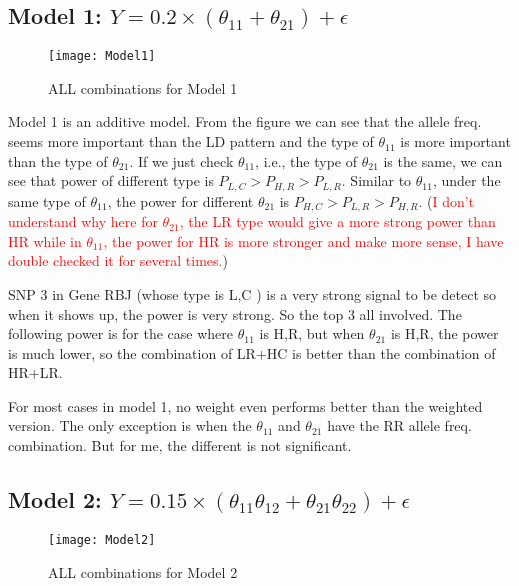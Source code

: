 \documentclass{article}
\begin{document}
    \subsection{Model 1: $Y=0.2\times(\theta_{11}+\theta_{21})+\epsilon$}    
        \begin{figure}[htbp]
            \centering
            \texttt{[image: Model1]}
            \caption{ALL combinations for Model 1}
        \end{figure}
        Model 1 is an additive model. From the figure we can see that the allele freq. seems more important than the LD pattern and the type of $\theta_{11}$ is more important than the type of $\theta_{21}$. If we just check $\theta_{11}$, i.e., the type of $\theta_{21}$ is the same, we can see that power of different type is $P_{L,C}>P_{H,R}>P_{L,R}$. Similar to $\theta_{11}$, under the same type of $\theta_{11}$, the power for different $\theta_{21}$ is $P_{H,C}>P_{L,R}>P_{H,R}$. (\textcolor{red}{I don't understand why here for $\theta_{21}$, the LR type would give a more strong power than HR while in $\theta_{11}$, the power for HR is more stronger and make more sense, I have double checked it for several times.})

        SNP 3 in Gene RBJ (whose type is L,C ) is a very strong signal to be detect so when it shows up, the power is very strong. So the top 3 all involved. The following power is for the case where $\theta_{11}$ is H,R, but when $\theta_{21}$ is H,R, the power is much lower, so the combination of LR+HC is better than the combination of HR+LR.

        For most cases in model 1, no weight even performs better than the weighted version. The only exception is when the $\theta_{11}$ and $\theta_{21}$ have the RR allele freq. combination. But for me, the different is not significant.

    \subsection{Model 2: $Y=0.15\times(\theta_{11}\theta_{12}+\theta_{21}\theta_{22})+\epsilon$}
    
        \begin{figure}[htbp]
            \centering
            \texttt{[image: Model2]}
            \caption{ALL combinations for Model 2}
        \end{figure}
\end{document}
